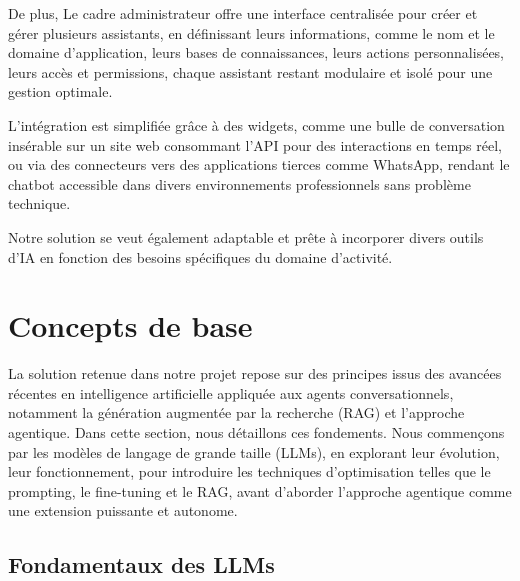 De plus, Le cadre administrateur offre une interface centralisée pour créer et gérer plusieurs assistants, en définissant leurs informations, comme le nom et le domaine d'application, leurs bases de connaissances, leurs actions personnalisées, leurs accès et permissions, chaque assistant restant modulaire et isolé pour une gestion optimale.

L'intégration est simplifiée grâce à des widgets, comme une bulle de conversation insérable sur un site web consommant l'API pour des interactions en temps réel, ou via des connecteurs vers des applications tierces comme WhatsApp, rendant le chatbot accessible dans divers environnements professionnels sans problème technique.

Notre solution se veut également adaptable et prête à incorporer divers outils d'IA en fonction des besoins spécifiques du domaine d'activité.


\section{Concepts de base}
La solution retenue dans notre projet repose sur des principes issus des avancées récentes en intelligence artificielle appliquée aux agents conversationnels, notamment la génération augmentée par la recherche (RAG) et l'approche agentique. Dans cette section, nous détaillons ces fondements. Nous commençons par les modèles de langage de grande taille (LLMs), en explorant leur évolution, leur fonctionnement, pour introduire les techniques d'optimisation telles que le prompting, le fine-tuning et le RAG, avant d'aborder l'approche agentique comme une extension puissante et autonome.

\subsection{Fondamentaux des LLMs}
